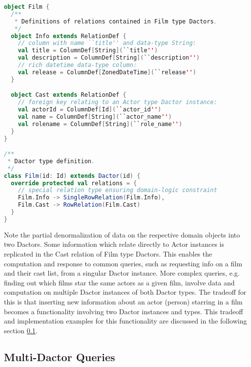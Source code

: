 \begin{lstlisting}[caption=Film Dactor type definition using the actordb framework, label=lst:film_definition, language=Scala]
object Film {
  /**
   * Definitions of relations contained in Film type Dactors.
   */
  object Info extends RelationDef {
    // column with name ``title'' and data-type String:
    val title = ColumnDef[String](``title'')
    val description = ColumnDef[String](``description'')
    // rich datetime data-type column:
    val release = ColumnDef[ZonedDateTime](``release'')
  }

  object Cast extends RelationDef {
    // foreign key relating to an Actor type Dactor instance:
    val actorId = ColumnDef[Id](``actor_id'')
    val name = ColumnDef[String](``actor_name'')
    val rolename = ColumnDef[String](``role_name'')
  }
} 

/**
 * Dactor type definition.
 */
class Film(id: Id) extends Dactor(id) {
  override protected val relations = {
    // special relation type ensuring domain-logic constraint
    Film.Info -> SingleRowRelation(Film.Info),
    Film.Cast -> RowRelation(Film.Cast)
  }
}
\end{lstlisting}

%

Note the partial denormalization of data on the respective domain objects into two Dactors.
Some information which relate directly to Actor instances is replicated in the Cast relation of Film type Dactors.
This enables the computation and response to common queries, such as requesting info on a film and their cast list, from a singular Dactor instance.
More complex queries, e.g. finding out which films star the same actors as a given film, involve data and computation on multiple Dactor instances of both Dactor types.
The tradeoff for this is that inserting new information about an actor (person) starring in a film becomes a functionality involving two Dactor instances and types.
This tradeoff and implementation examples for this functionality are discussed in the following section \ref{subsec:multi_dactor_queries}.


\subsection{Multi-Dactor Queries}\label{subsec:multi_dactor_queries}

